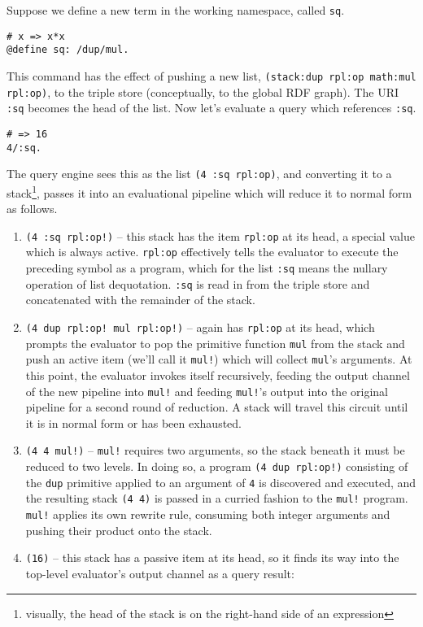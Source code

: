 \documentclass[runningheads]{llncs}
\begin{document}
Suppose we define a new term in the working namespace, called \texttt{sq}.

\begin{verbatim}
# x => x*x
@define sq: /dup/mul.
\end{verbatim}

This command has the effect of pushing a new list, \texttt{(stack:dup rpl:op math:mul rpl:op)}, to the triple store (conceptually, to the global RDF graph).  The URI \texttt{:sq} becomes the head of the list.  Now let's evaluate a query which references \texttt{:sq}.

\begin{verbatim}
# => 16
4/:sq.
\end{verbatim}

The query engine sees this as the list \texttt{(4 :sq rpl:op)}, and converting it to a stack\footnote{visually, the head of the stack is on the right-hand side of an expression}, passes it into an evaluational pipeline which will reduce it to normal form as follows.

\begin{enumerate}
\item \texttt{(4 :sq rpl:op!)} -- this stack has the item \texttt{rpl:op} at its head, a special value which is always active.  \texttt{rpl:op} effectively tells the evaluator to execute the preceding symbol as a program, which for the list \texttt{:sq} means the nullary operation of list dequotation.  \texttt{:sq} is read in from the triple store and concatenated with the remainder of the stack.
\item \texttt{(4 dup rpl:op! mul rpl:op!)} -- again has \texttt{rpl:op} at its head, which prompts the evaluator to pop the primitive function \texttt{mul} from the stack and push an active item (we'll call it \texttt{mul!}) which will collect \texttt{mul}'s arguments.  At this point, the evaluator invokes itself recursively, feeding the output channel of the new pipeline into \texttt{mul!} and feeding \texttt{mul!}'s output into the original pipeline for a second round of reduction.  A stack will travel this circuit until it is in normal form or has been exhausted.
\item \texttt{(4 4 mul!)} -- \texttt{mul!} requires two arguments, so the stack beneath it must be reduced to two levels.  In doing so, a program \texttt{(4 dup rpl:op!)} consisting of the \texttt{dup} primitive applied to an argument of \texttt{4} is discovered and executed, and the resulting stack \texttt{(4 4)} is passed in a curried fashion to the \texttt{mul!} program.  \texttt{mul!} applies its own rewrite rule, consuming both integer arguments and pushing their product onto the stack.
\item \texttt{(16)} -- this stack has a passive item at its head, so it finds its way into the top-level evaluator's output channel as a query result:
\end{enumerate}
\end{document}
